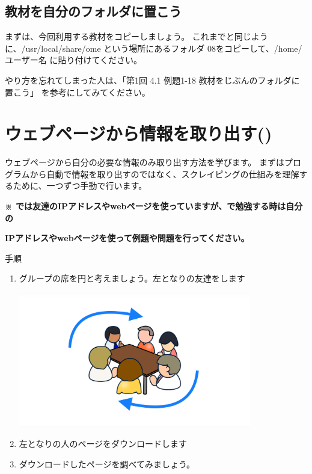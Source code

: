\subsection*{教材を自分のフォルダに置こう}
まずは、今回利用する教材をコピーしましょう。
これまでと同じように、/usr/local/share/ome という場所にあるフォルダ 08をコピーして、/home/ユーザー名 に貼り付けてください。

やり方を忘れてしまった人は、「第1回 4.1 例題1-18 教材をじぶんのフォルダに置こう」 を参考にしてみてください。

\bigskip


\bigskip

\clearpage
{}\label{P:intro}
\section{ウェブページから情報を取り出す()}
ウェブページから自分の必要な情報のみ取り出す方法を学びます。
まずはプログラムから自動で情報を取り出すのではなく、スクレイピングの仕組みを理解するために、一つずつ手動で行います。



\bigskip

{\bfseries\color[rgb]{1.0,0.2,0.2}
※ では友達のIPアドレスやwebページを使っていますが、で勉強する時は自分の }

{\bfseries\color[rgb]{1.0,0.2,0.2}
    IPアドレスやwebページを使って例題や問題を行ってください。}

手順
\begin{enumerate}

	\item
グループの席を円と考えましょう。左となりの友達をします


\bigskip



\begin{center}
\includegraphics[width=10.174cm]{./text08-img/textbook-img001.jpg}

\end{center}

\bigskip


\bigskip


\bigskip



\item
左となりの人のページをダウンロードします

\item
ダウンロードしたページを調べてみましょう。
\end{enumerate}

